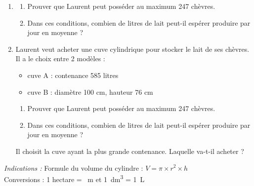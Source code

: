 \documentclass[main.tex]{subfiles}
\begin{document}
\begin{exercise}
{  
}    
\begin{enumerate}[label=\arabic*),leftmargin=*]
		\item  
		\begin{enumerate}[label=\alph*),leftmargin=*]
			\item Prouver que Laurent peut posséder au maximum 247 chèvres.
			\item Dans ces conditions, combien de litres de lait peut-il espérer produire par jour en moyenne ?
		\end{enumerate}
		\item  Laurent veut acheter une cuve cylindrique pour stocker le lait de ses
		chèvres. 
		Il a le choix entre 2 modèles : 
		\begin{itemize}
			\item[$\bullet~~$] cuve A : contenance 585 litres
			\item[$\bullet~~$] cuve B : diamètre 100 cm, hauteur 76 cm
		\end{itemize}
		\begin{enumerate}[label=\alph*),leftmargin=*]
			\item Prouver que Laurent peut posséder au maximum 247 chèvres.
			\item Dans ces conditions, combien de litres de lait peut-il espérer produire par jour en moyenne ?
		\end{enumerate}
		Il choisit la cuve ayant la plus grande contenance. Laquelle va-t-il acheter ?
\end{enumerate}
 \emph{Indications :} Formule du volume du cylindre : $V = \pi \times  r^2 \times h$\\
 	Conversions : 1 hectare = ~\si{\meter} et 1~\si{\deci\meter^3} = \SI{1}{\liter} 
\end{exercise}

%	 
\end{document}
